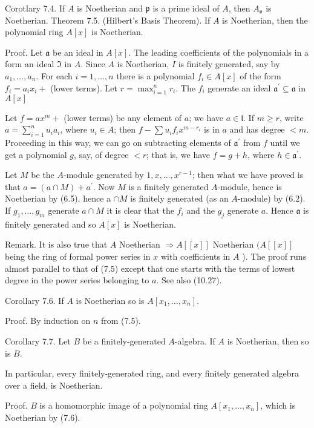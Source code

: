 \documentclass{standalone}
\theoremstyle{definition}
\theoremstyle{remark}
\begin{document}
Corotlary 7.4. If $A$ is Noetherian and $\mathfrak{p}$ is a prime ideal of $A$, then $A_{\mathfrak{v}}$ is Noetherian. Theorem 7.5. (Hilbert's Basis Theorem). If $A$ is Noetherian, then the polynomial ring $A[x]$ is Noetherian.

Proof. Let $\mathfrak{a}$ be an ideal in $A[x]$. The leading coefficients of the polynomials in a form an ideal $\mathfrak{I}$ in $A$. Since $A$ is Noetherian, $I$ is finitely generated, say by $a_{1}, \ldots, a_{n}$. For each $i=1, \ldots, n$ there is a polynomial $f_{i} \in A[x]$ of the form $f_{i}=a_{i} x_{i}+$ (lower terms). Let $r=\max _{i=1}^{n} r_{i}$. The $f_{i}$ generate an ideal $\mathfrak{a}^{\prime} \subseteq \mathfrak{a}$ in $A[x]$

Let $f=a x^{m}+$ (lower terms) be any element of $a$; we have $a \in \mathfrak{l}$. If $m \geqslant r$, write $a=\sum_{i=1}^{n} u_{i} a_{i}$, where $u_{i} \in A$; then $f-\sum u_{i} f_{i} x^{m-r_{i}}$ is in $a$ and has degree $<m$. Proceeding in this way, we can go on subtracting elements of $\mathfrak{a}^{\prime}$ from $f$ until we get a polynomial $g$, say, of degree $<r$; that is, we have $f=g+h$, where $h \in \mathfrak{a}^{\prime}$.

Let $M$ be the $A$-module generated by $1, x, \ldots, x^{r-1}$; then what we have proved is that $a=(a \cap M)+a^{\prime}$. Now $M$ is a finitely generated $A$-module, hence is Noetherian by (6.5), hence a $\cap M$ is finitely generated (as an $A$-module) by (6.2). If $g_{1}, \ldots, g_{m}$ generate $a \cap M$ it is clear that the $f_{i}$ and the $g_{j}$ generate $a$. Hence $\mathfrak{a}$ is finitely generated and so $A[x]$ is Noetherian.

Remark. It is also true that $A$ Noetherian $\Rightarrow A[[x]]$ Noetherian $(A[[x]]$ being the ring of formal power series in $x$ with coefficients in $A$ ). The proof runs almost parallel to that of (7.5) except that one starts with the terms of lowest degree in the power series belonging to $a$. See also (10.27).

Corollary 7.6. If $A$ is Noetherian so is $A\left[x_{1}, \ldots, x_{n}\right]$.

Proof. By induction on $n$ from (7.5).

Corollary 7.7. Let $B$ be a finitely-generated $A$-algebra. If $A$ is Noetherian, then so is $B$.

In particular, every finitely-generated ring, and every finitely generated algebra over a field, is Noetherian.

Proof. $B$ is a homomorphic image of a polynomial ring $A\left[x_{1}, \ldots, x_{n}\right]$, which is Noetherian by (7.6).
\end{document}
